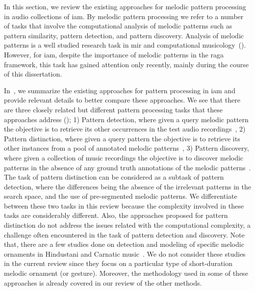 In this section, we review the existing approaches for melodic pattern processing in audio collections of \gls{iam}. By melodic pattern processing we refer to a number of tasks that involve the computational analysis of melodic patterns such as pattern similarity, pattern detection, and pattern discovery. Analysis of melodic patterns is a well studied research task in \gls{mir} and computational musicology~(). However, for \gls{iam}, despite the importance of melodic patterns in the \gls{raga} framework, this task has gained attention only recently, mainly during the course of this dissertation. 

In~, we summarize the existing approaches for pattern processing in \gls{iam} and provide relevant details to better compare these approaches. We see that there are three closely related but different pattern processing tasks that these approaches address (); 1) Pattern detection, where given a query melodic pattern the objective is to retrieve its other occurrences in the test audio recordings~\citep{Ross2012,Ross2012b,Ishwar2013,dutta2014modified,ganguli2015efficient}, 2) Pattern distinction, where given a query pattern the objective is to retrieve its other instances from a pool of annotated melodic patterns~\citep{ishwar2012motivic,rao2013distinguishing,Rao2014}, 3) Pattern discovery, where given a collection of music recordings the objective is to discover melodic patterns in the absence of any ground truth annotations of the melodic patterns~\citep{Dutta2014}. The task of pattern distinction can be considered as a subtask of pattern detection, where the differences being the absence of the irrelevant patterns in the search space, and the use of pre-segmented melodic patterns. We differentiate between these two tasks in this review because the complexity involved in these tasks are considerably different. Also, the approaches proposed for pattern distinction do not address the issues related with the computational complexity, a challenge often encountered in the task of pattern detection and discovery. Note that, there are a few studies done on detection and modeling of specific melodic ornaments in Hindustani and Carnatic music~\citep{Subramanian2012,Datta2007,narayan2014detection,pratyush_2010}. We do not consider these studies in the current review since they focus on a particular type of short-duration melodic ornament (or gesture). Moreover, the methodology used in some of these approaches is already covered in our review of the other methods.

